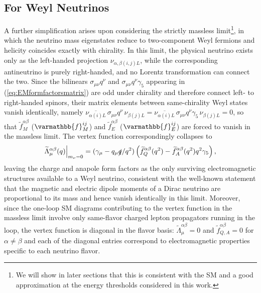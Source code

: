 \subsection{For Weyl Neutrinos}
A further simplification arises upon considering the strictly massless limit\footnote{We will show in later sections that this is consistent with the SM and a good approximation at the energy thresholds considered in this work.}, in which the neutrino mass eigenstates reduce to two-component Weyl fermions and helicity coincides exactly with chirality. In this limit, the physical neutrino exists only as the left-handed projection $\nu_{\alpha,\beta(i,j)L}$, while the corresponding antineutrino is purely right-handed, and no Lorentz transformation can connect the two. Since the bilinears $\sigma_{\mu\nu}q^\nu$ and $\sigma_{\mu\nu}q^\nu\gamma_5$ appearing in (\ref{eq:EMformfactorsmatrix}) are odd under chirality and therefore connect left- to right-handed spinors, their matrix elements between same-chirality Weyl states vanish identically, namely $\overline{\nu_{\alpha(i)L}}\,\sigma_{\mu\nu}q^\nu\,\nu_{\beta(j)L} = \overline{\nu_{\alpha(i)L}}\,\sigma_{\mu\nu}q^\nu\gamma_5\,\nu_{\beta(j)L} = 0$, so that $\widetilde f^{\alpha\beta}_M$ ($\varmathbb{f}^{ij}_M$) and $\widetilde f^{\alpha\beta}_E$ ($\varmathbb{f}^{ij}_E$) are forced to vanish in the massless limit. The vertex function correspondingly collapses to
\begin{equation}\label{eq:Lambdamassless}
\widetilde\Lambda^{\alpha\beta}_\mu(q)\Big|_{m_\nu = 0} = (\gamma_\mu - q_\mu\slashed{q}/q^2)\left(\widetilde f^{\alpha\beta}_Q(q^2) - \widetilde f^{\alpha\beta}_A(q^2)q^2\gamma_5\right),
\end{equation}
leaving the charge and anapole form factors as the only surviving electromagnetic structures available to a Weyl neutrino, consistent with the well-known statement that the magnetic and electric dipole moments of a Dirac neutrino are proportional to its mass and hence vanish identically in this limit. Moreover, since the one-loop SM diagrams contributing to the vertex function in the massless limit involve only same-flavor charged lepton propagators running in the loop, the vertex function is diagonal in the flavor basis: $\widetilde\Lambda^{\alpha\beta}_\mu = 0$ and $\widetilde{f}^{\alpha\beta}_{Q,A} = 0$ for $\alpha \neq \beta$ and each of the diagonal entries correspond to electromagnetic properties specific to each neutrino flavor.
